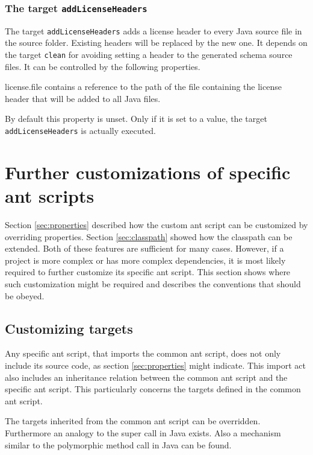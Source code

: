 \documentclass[a4paper,twoside,11pt,bibtotoc]{article}
\begin{document}
\subsubsection{The target \texttt{addLicenseHeaders}}
The target \texttt{addLicenseHeaders} adds a license header to every Java source file in the source folder.
Existing headers will be replaced by the new one.
It depends on the target \texttt{clean} for avoiding setting a header to the generated schema source files.
It can be controlled by the following properties.
\begin{description*}
	\item[license.file] contains a reference to the path of the file containing the license header that will be added to all Java files.\par By default this property is unset. Only if it is set to a value, the target \texttt{addLicenseHeaders} is actually executed.
\end{description*}

\section{Further customizations of specific ant scripts}
\label{sec:customize}
Section \ref{sec:properties} described how the custom ant script can be customized by overriding properties.
Section \ref{sec:classpath} showed how the classpath can be extended.
Both of these features are sufficient for many cases.
However, if a project is more complex or has more complex dependencies, it is most likely required to further customize its specific ant script.
This section shows where such customization might be required and describes the conventions that should be obeyed.

\subsection{Customizing targets}
Any specific ant script, that imports the common ant script, does not only include its source code, as section \ref{sec:properties} might indicate.
This import act also includes an inheritance relation between the common ant script and the specific ant script.
This particularly concerns the targets defined in the common ant script.

The targets inherited from the common ant script can be overridden.
Furthermore an analogy to the super call in Java exists.
Also a mechanism similar to the polymorphic method call in Java can be found.
\end{document}
